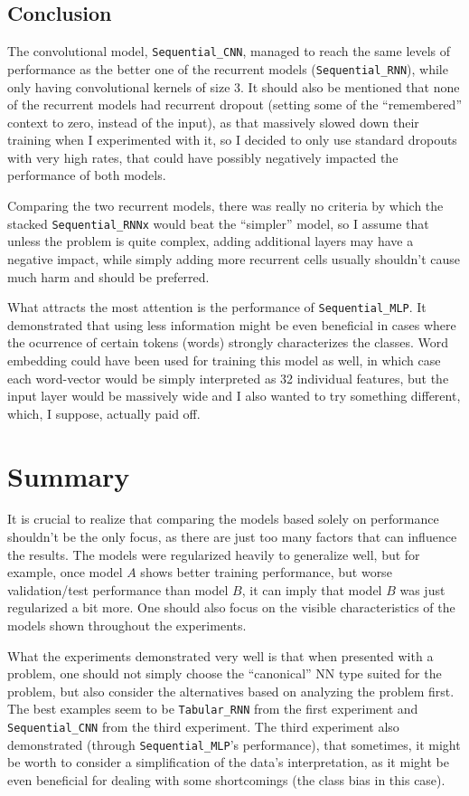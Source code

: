 \subsection{Conclusion}
The convolutional model, \texttt{Sequential\_CNN}, managed to reach the same levels of performance as the better one
of the
recurrent models (\texttt{Sequential\_RNN}), while only having convolutional kernels of size 3. It should
also be mentioned that none of the recurrent models had recurrent dropout (setting some of the ``remembered''
context to zero, instead of the input), as that massively slowed down their training when I experimented with it,
so I decided to only use standard dropouts with very high rates, that could have possibly negatively impacted
the performance of both models.

Comparing the two recurrent models, there was really no criteria by which the stacked \texttt{Sequential\_RNNx}
would beat the ``simpler'' model, so I assume that unless the problem is quite complex, adding additional layers
may have a negative impact, while simply adding more recurrent cells usually shouldn't cause much harm
and should be preferred.

What attracts the most attention is the performance of \texttt{Sequential\_MLP}. It demonstrated
that using less information might be even beneficial in cases where the ocurrence of certain tokens (words)
strongly characterizes the classes. Word embedding could have been used for training this model as well,
in which case each word-vector would be simply interpreted as 32 individual features, but the input
layer would be massively wide and I also wanted to try something different,
which, I suppose, actually paid off.




\section{Summary}
\label{experiment-summary}
It is crucial to realize that comparing the models based solely on performance shouldn't be the only focus,
as there are just too many factors that can influence the results. The models were regularized heavily to
generalize
well, but for example, once model $A$ shows better training performance, but worse validation/test performance
than model $B$, it can imply that model $B$ was just regularized a bit more. One should also focus
on the visible characteristics of the models shown throughout the experiments. 

What the experiments demonstrated very well is that when presented with a problem,
one should not simply choose the ``canonical'' NN type suited for the problem, but also consider
the alternatives based on analyzing the problem first.
The best examples seem to be \texttt{Tabular\_RNN}
from the first experiment and \texttt{Sequential\_CNN} from the third experiment.
The third experiment also demonstrated (through \texttt{Sequential\_MLP}'s performance), that sometimes,
it might be worth to consider a simplification of the data's interpretation, as it might be even beneficial
for dealing with some shortcomings (the class bias in this case).

